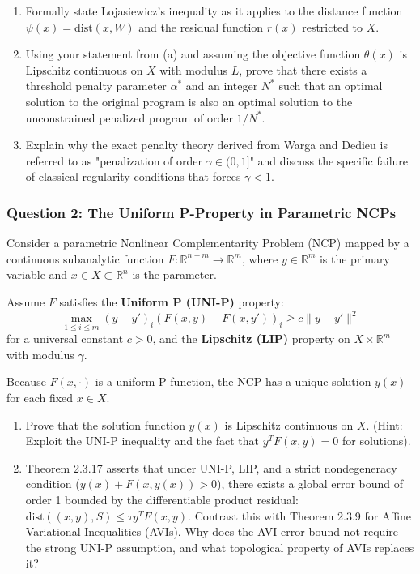 \documentclass[pdflatex,sn-mathphys-num]{sn-jnl}%
\theoremstyle{definition}
\begin{document}
\begin{enumerate}
    \item[(a)] Formally state Lojasiewicz's inequality as it applies to the distance function $\psi(x) = \text{dist}(x, W)$ and the residual function $r(x)$ restricted to $X$. 
    \item[(b)] Using your statement from (a) and assuming the objective function $\theta(x)$ is Lipschitz continuous on $X$ with modulus $L$, prove that there exists a threshold penalty parameter $\alpha^*$ and an integer $N^*$ such that an optimal solution to the original program is also an optimal solution to the unconstrained penalized program of order $1/N^*$.
    \item[(c)] Explain why the exact penalty theory derived from Warga and Dedieu is referred to as "penalization of order $\gamma \in (0,1]$" and discuss the specific failure of classical regularity conditions that forces $\gamma < 1$.
\end{enumerate}

\subsubsection*{Question 2: The Uniform P-Property in Parametric NCPs}
Consider a parametric Nonlinear Complementarity Problem (NCP) mapped by a continuous subanalytic function $F: \mathbb{R}^{n+m} \to \mathbb{R}^m$, where $y \in \mathbb{R}^m$ is the primary variable and $x \in X \subset \mathbb{R}^n$ is the parameter. 

Assume $F$ satisfies the \textbf{Uniform P (UNI-P)} property:
$$ \max_{1 \le i \le m} (y - y')_i (F(x,y) - F(x,y'))_i \ge c \|y - y'\|^2 $$
for a universal constant $c > 0$, and the \textbf{Lipschitz (LIP)} property on $X \times \mathbb{R}^m$ with modulus $\gamma$. 

Because $F(x, \cdot)$ is a uniform P-function, the NCP has a unique solution $y(x)$ for each fixed $x \in X$.
\begin{enumerate}
    \item[(a)] Prove that the solution function $y(x)$ is Lipschitz continuous on $X$. (Hint: Exploit the UNI-P inequality and the fact that $y^T F(x,y) = 0$ for solutions).
    \item[(b)] Theorem 2.3.17 asserts that under UNI-P, LIP, and a strict nondegeneracy condition ($y(x) + F(x,y(x)) > 0$), there exists a global error bound of order 1 bounded by the differentiable product residual: $\text{dist}((x,y), S) \le \tau y^T F(x,y)$. Contrast this with Theorem 2.3.9 for Affine Variational Inequalities (AVIs). Why does the AVI error bound not require the strong UNI-P assumption, and what topological property of AVIs replaces it?
\end{enumerate}
\end{document}
